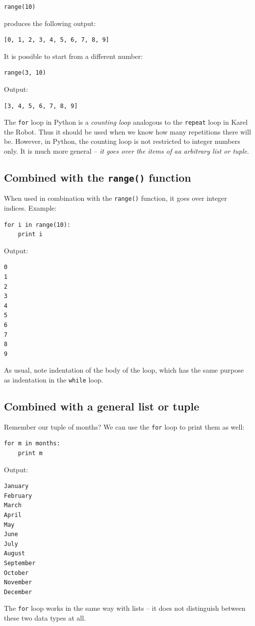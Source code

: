 \begin{verbatim}
range(10)
\end{verbatim}
produces the following output:

\begin{verbatim}
[0, 1, 2, 3, 4, 5, 6, 7, 8, 9]
\end{verbatim}
It is possible to start from a different number:

\begin{verbatim}
range(3, 10)
\end{verbatim}
Output:

\begin{verbatim}
[3, 4, 5, 6, 7, 8, 9]
\end{verbatim}
The {\tt for} loop in Python is a {\em counting loop} analogous to the {\tt repeat}
loop in Karel the Robot. Thus it should be used when we know how many repetitions there 
will be. However, in Python, the counting loop is not restricted to integer numbers 
only. It is much more general -- {\em it goes over the items of aa arbitrary list or tuple}. 

\subsection{Combined with the {\tt range()} function}

When used in combination with the {\tt range()} function, it goes over integer indices. 
Example:

\begin{verbatim}
for i in range(10):
    print i
\end{verbatim}
Output:

\begin{verbatim}
0
1
2
3
4
5
6
7
8
9
\end{verbatim}
As usual, note indentation of the body of the loop, which has the same 
purpose as indentation in the {\tt while} loop. 

\subsection{Combined with a general list or tuple}

Remember our tuple of months? We can use the {\tt for} loop to print them as well:

\begin{verbatim}
for m in months:
    print m
\end{verbatim}
Output:

\begin{verbatim}
January
February
March
April
May
June
July
August
September
October
November
December
\end{verbatim}
The {\tt for} loop works in the same way with lists -- it does not distinguish between these 
two data types at all.

